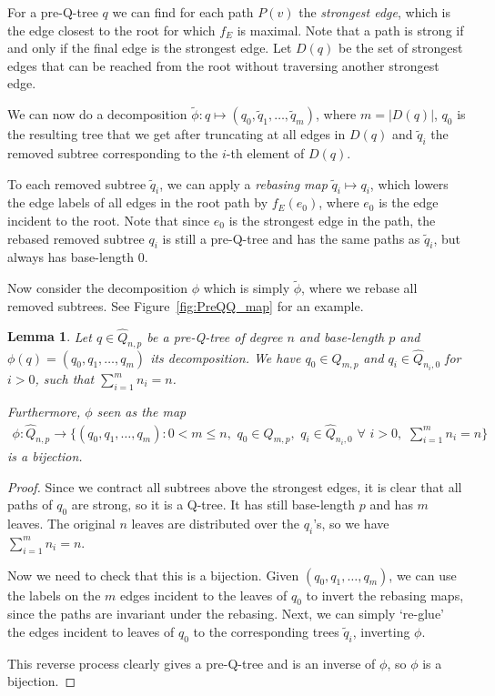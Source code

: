 \documentclass[11pt]{article}
\theoremstyle{plain}
\newtheorem{lemma}[theorem]{Lemma}
\theoremstyle{definition}
\begin{document}
For a pre-Q-tree $q$ we can find for each path $P(v)$ the \emph{strongest edge}, which is the edge closest to the root for which $f_E$ is maximal.
Note that a path is strong if and only if the final edge is the strongest edge.
Let $D(q)$ be the set of strongest edges that can be reached from the root without traversing another strongest edge.

We can now do a decomposition $\tilde{\phi}: q\mapsto(q_0,\tilde{q}_1,\dots,\tilde{q}_m)$, where $m=|D(q)|$, $q_0$ is the resulting tree that we get after truncating at all edges in $D(q)$ and $\tilde{q}_i$ the removed subtree corresponding to the $i$-th element of $D(q)$.

To each removed subtree $\tilde{q}_i$, we can apply a \emph{rebasing map} $\tilde{q}_i\mapsto q_i$, which lowers the edge labels of all edges in the root path by $f_E(e_0)$, where $e_0$ is the edge incident to the root. 
Note that since $e_0$ is the strongest edge in the path, the rebased removed subtree $q_i$ is still a pre-Q-tree and has the same paths as $\tilde{q}_i$, but always has base-length $0$.

Now consider the decomposition $\phi$ which is simply $\tilde{\phi}$, where we rebase all removed subtrees. See Figure~\ref{fig:PreQQ_map} for an example.

\begin{lemma}\label{lem:decomp}
    Let $q\in\hat{Q}_{n,p}$ be a pre-Q-tree of degree $n$ and base-length $p$ and $\phi(q)=(q_0,q_1,\dots,q_m)$ its decomposition.
    We have $q_0\in Q_{m,p}$ and $q_i\in\hat{Q}_{n_i,0}$ for $i>0$, such that $\sum_{i=1}^m n_i=n$.

    Furthermore, $\phi$ seen as the map
    \begin{align}
        \phi: \hat{Q}_{n,p} \rightarrow \Big\{(q_0,q_1,\dots,q_m): 0<m\leq n,\,\, q_0\in Q_{m,p},\,\, q_i\in\hat{Q}_{n_i,0}\,\,\forall\,\,i>0,\,\, \sum_{i=1}^m n_i=n\Big\}
    \end{align} 
    is a bijection.
\end{lemma}
\begin{proof}
    Since we contract all subtrees above the strongest edges, it is clear that all paths of $q_0$ are strong, so it is a Q-tree.
    It has still base-length $p$ and has $m$ leaves. 
    The original $n$ leaves are distributed over the $q_i$'s, so we have $\sum_{i=1}^m n_i=n$.

    Now we need to check that this is a bijection. 
    Given $(q_0,q_1,\dots,q_m)$, we can use the labels on the $m$ edges incident to the leaves of $q_0$ to invert the rebasing maps, since the paths are invariant under the rebasing. 
    Next, we can simply `re-glue' the edges incident to leaves of $q_0$ to the corresponding trees $\tilde{q}_i$, inverting $\phi$. 
    
    This reverse process clearly gives a pre-Q-tree and is an inverse of $\phi$, so $\phi$ is a bijection.
\end{proof}
\end{document}
